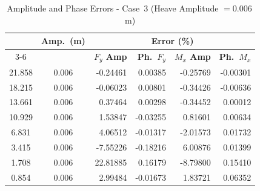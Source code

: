 \documentclass[../main]{subfiles}
\begin{document}
\begin{table}[htbp]
\centering
\caption{Amplitude and Phase Errors - Case~3 (Heave Amplitude $= 0.006$\,m)}
\label{tab:err_case3}
\renewcommand{\arraystretch}{1.25}
\begin{tabular}{|c|c|r|r|r|r|}
\hline
\rule{0pt}{12pt}
\multirow{2}{*}{\textbf{$U_r$}} &
\multirow{2}{*}{\textbf{Amp.\ (m)}} &
\multicolumn{4}{c|}{\textbf{Error (\%)}} \\[2pt]
\cline{3-6}
\rule{0pt}{10pt} & &
\textbf{$F_y$ Amp} &
\textbf{Ph.\ $F_y$} &
\textbf{$M_x$ Amp} &
\textbf{Ph.\ $M_x$} \\[4pt]
\hline
21.858 & 0.006 &  -0.24461 &  0.00385 & -0.25769 & -0.00301 \\
18.215 & 0.006 &  -0.06023 &  0.00801 & -0.34426 & -0.00636 \\
13.661 & 0.006 &   0.37464 &  0.00298 & -0.34452 &  0.00012 \\
10.929 & 0.006 &   1.53847 & -0.03255 &  0.81601 &  0.00634 \\
 6.831 & 0.006 &   4.06512 & -0.01317 & -2.01573 &  0.01732 \\
 3.415 & 0.006 &  -7.55226 & -0.18216 &  6.00876 &  0.01399 \\
 1.708 & 0.006 &  22.81885 &  0.16179 & -8.79800 &  0.15410 \\
 0.854 & 0.006 &   2.99484 & -0.01673 &  1.83721 &  0.06352 \\
\hline
\end{tabular}
\end{table}

\FloatBarrier
\end{document}
